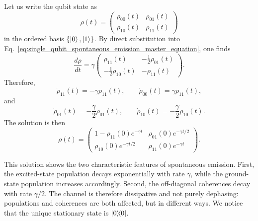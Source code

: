 Let us write the qubit state as
\begin{equation}
	\rho(t)
	=
	\begin{pmatrix}
		\rho_{00}(t) & \rho_{01}(t) \\
		\rho_{10}(t) & \rho_{11}(t)
	\end{pmatrix}
\end{equation}
in the ordered basis \(\{\ket{0},\ket{1}\}\). By direct substitution into Eq.~\eqref{eq:single_qubit_spontaneous_emission_master_equation}, one finds
\begin{equation}
	\frac{d\rho}{dt}
	=
	\gamma
	\begin{pmatrix}
		\rho_{11}(t) & -\frac{1}{2}\rho_{01}(t) \\
		-\frac{1}{2}\rho_{10}(t) & -\rho_{11}(t)
	\end{pmatrix}.
	\label{eq:single_qubit_spontaneous_emission_matrix_equation}
\end{equation}
Therefore,
\begin{equation}
	\dot{\rho}_{11}(t) = -\gamma \rho_{11}(t),
	\qquad
	\dot{\rho}_{00}(t) = \gamma \rho_{11}(t),
	\label{eq:single_qubit_spontaneous_emission_populations}
\end{equation}
and
\begin{equation}
	\dot{\rho}_{01}(t) = -\frac{\gamma}{2}\rho_{01}(t),
	\qquad
	\dot{\rho}_{10}(t) = -\frac{\gamma}{2}\rho_{10}(t).
	\label{eq:single_qubit_spontaneous_emission_coherences}
\end{equation}
The solution is then
\begin{equation}
	\rho(t)
	=
	\begin{pmatrix}
		1-\rho_{11}(0)e^{-\gamma t} & \rho_{01}(0)e^{-\gamma t/2} \\
		\rho_{10}(0)e^{-\gamma t/2} & \rho_{11}(0)e^{-\gamma t}
	\end{pmatrix}.
	\label{eq:single_qubit_spontaneous_emission_full_solution}
\end{equation}

This solution shows the two characteristic features of spontaneous emission. First, the excited-state population decays exponentially with rate \(\gamma\), while the ground-state population increases accordingly. Second, the off-diagonal coherences decay with rate \(\gamma/2\). The channel is therefore dissipative and not purely dephasing: populations and coherences are both affected, but in different ways. We notice that the unique stationary state is $\dyad{0}{0}$.

